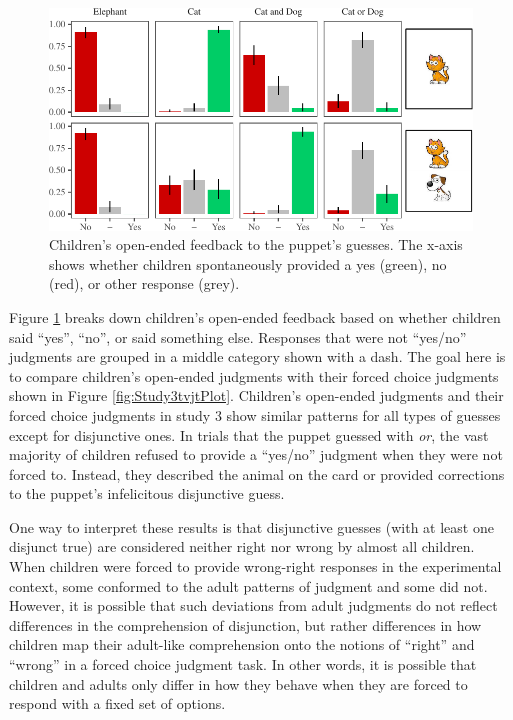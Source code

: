 \documentclass[man]{apa6}
\theoremstyle{definition}
\theoremstyle{definition}
\theoremstyle{definition}
\theoremstyle{remark}
\begin{document}
\begin{figure}[t]

{\centering \includegraphics{figs/study3JudgmentPlot-1} 

}

\caption{Children's open-ended feedback to the puppet's guesses. The x-axis shows whether children spontaneously provided a yes (green), no (red), or other response (grey).}\label{fig:study3JudgmentPlot}
\end{figure}

Figure \ref{fig:study3JudgmentPlot} breaks down children's open-ended
feedback based on whether children said \enquote{yes}, \enquote{no}, or
said something else. Responses that were not \enquote{yes/no} judgments
are grouped in a middle category shown with a dash. The goal here is to
compare children's open-ended judgments with their forced choice
judgments shown in Figure \ref{fig:Study3tvjtPlot}. Children's
open-ended judgments and their forced choice judgments in study 3 show
similar patterns for all types of guesses except for disjunctive ones.
In trials that the puppet guessed with \emph{or}, the vast majority of
children refused to provide a \enquote{yes/no} judgment when they were
not forced to. Instead, they described the animal on the card or
provided corrections to the puppet's infelicitous disjunctive guess.

One way to interpret these results is that disjunctive guesses (with at
least one disjunct true) are considered neither right nor wrong by
almost all children. When children were forced to provide wrong-right
responses in the experimental context, some conformed to the adult
patterns of judgment and some did not. However, it is possible that such
deviations from adult judgments do not reflect differences in the
comprehension of disjunction, but rather differences in how children map
their adult-like comprehension onto the notions of \enquote{right} and
\enquote{wrong} in a forced choice judgment task. In other words, it is
possible that children and adults only differ in how they behave when
they are forced to respond with a fixed set of options.
\end{document}

